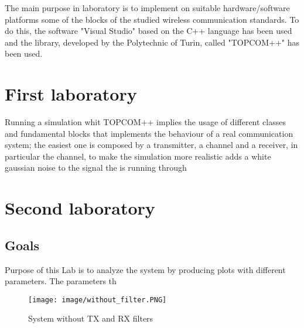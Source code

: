 \documentclass[12pt,  english, makeidx, a4paper, titlepage, oneside]{article}
\begin{document}
The main purpose in laboratory is to implement on suitable hardware/software platforms some of the blocks of the studied wireless communication standards.
To do this, the software "Visual Studio" based on the C++ language has been used and the library, developed by the Polytechnic of Turin, called "TOPCOM++" has been used.

\section{First laboratory}
Running a simulation whit TOPCOM++ implies the usage of different classes and fundamental blocks that implements the behaviour of a real communication system; the easiest one is composed by a transmitter, a channel and a receiver, in particular the channel, to make the simulation more realistic adds a white gaussian noise to the signal the is running through 


\section{Second laboratory}
\subsection{Goals}
Purpose of this Lab is to analyze the system by producing plots with different parameters.
The parameters th


\begin{figure}[H]
    \centering
    \texttt{[image: image/without\_filter.PNG]}
    \caption*{System without TX and RX filters}
    \label{fig:without_filter}
\end{figure}
\end{document}
